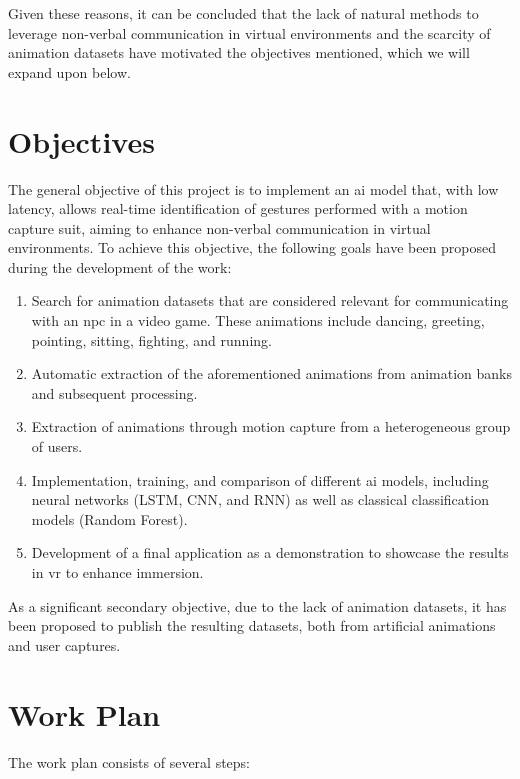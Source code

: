 Given these reasons, it can be concluded that the lack of natural methods to leverage non-verbal communication in virtual environments and the scarcity of animation datasets have motivated the objectives mentioned, which we will expand upon below.

\section{Objectives}

The general objective of this project is to implement an \gls{ai} model that, with low latency, allows real-time identification of gestures performed with a motion capture suit, aiming to enhance non-verbal communication in virtual environments.
To achieve this objective, the following goals have been proposed during the development of the work:
\begin{enumerate}
	\item Search for animation datasets that are considered relevant for communicating with an \gls{npc} in a video game. These animations include dancing, greeting, pointing, sitting, fighting, and running.
	\item Automatic extraction of the aforementioned animations from animation banks and subsequent processing.
	\item Extraction of animations through motion capture from a heterogeneous group of users.
	\item Implementation, training, and comparison of different \gls{ai} models, including neural networks (LSTM, CNN, and RNN) as well as classical classification models (Random Forest).
	\item Development of a final application as a demonstration to showcase the results in \gls{vr} to enhance immersion.
\end{enumerate}

As a significant secondary objective, due to the lack of animation datasets, it has been proposed to publish the resulting datasets, both from artificial animations and user captures.

\section{Work Plan}


The work plan consists of several steps:

